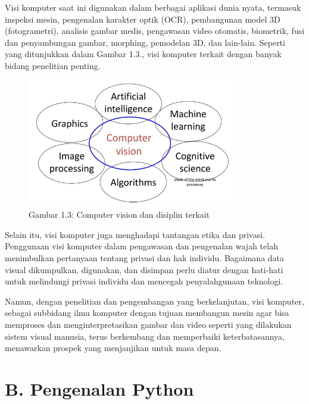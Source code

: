 \documentclass[
  letterpaper,
  DIV=11,
  numbers=noendperiod]{scrreprt}
\begin{document}
Visi komputer saat ini digunakan dalam berbagai aplikasi dunia nyata,
termasuk inspeksi mesin, pengenalan karakter optik (OCR), pembangunan
model 3D (fotogrametri), analisis gambar medis, pengawasan video
otomatis, biometrik, fusi dan penyambungan gambar, morphing, pemodelan
3D, dan lain-lain. Seperti yang ditunjukkan dalam Gambar 1.3., visi
komputer terkait dengan banyak bidang penelitian penting.

\begin{figure}

{\centering \includegraphics{Asset/image5.png}

}

\caption{Gambar 1.3: Computer vision dan disiplin terkait}

\end{figure}

Selain itu, visi komputer juga menghadapi tantangan etika dan privasi.
Penggunaan visi komputer dalam pengawasan dan pengenalan wajah telah
menimbulkan pertanyaan tentang privasi dan hak individu. Bagaimana data
visual dikumpulkan, digunakan, dan disimpan perlu diatur dengan
hati-hati untuk melindungi privasi individu dan mencegah penyalahgunaan
teknologi.

Namun, dengan penelitian dan pengembangan yang berkelanjutan, visi
komputer, sebagai subbidang ilmu komputer dengan tujuan membangun mesin
agar bisa memproses dan menginterpretasikan gambar dan video seperti
yang dilakukan sistem visual manusia, terus berkembang dan memperbaiki
keterbatasannya, menawarkan prospek yang menjanjikan untuk masa depan.

\hypertarget{b.-pengenalan-python}{%
\section*{B. Pengenalan Python}\label{b.-pengenalan-python}}

\end{document}
